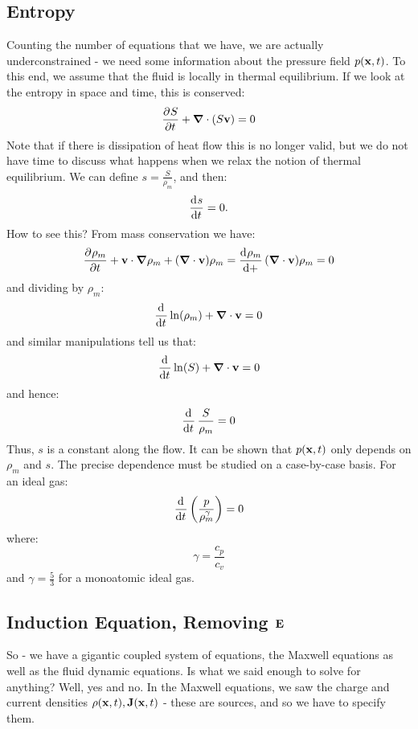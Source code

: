 \subsection{Entropy}
Counting the number of equations that we have, we are actually underconstrained - we need some information about the pressure field $p(\mathbf{x}, t)$. To this end, we assume that the fluid is locally in thermal equilibrium. If we look at the entropy in space and time, this is conserved:
\begin{equation}
    \dpd{S}{t} + \nabla\cdot (S\v{v}) = 0
\end{equation}
Note that if there is dissipation of heat flow this is no longer valid, but we do not have time to discuss what happens when we relax the notion of thermal equilibrium. We can define $s = \frac{S}{\rho_m}$, and then:
\begin{equation}
    \dod{s}{t} = 0.
\end{equation}
How to see this? From mass conservation we have:
\begin{equation}
    \dpd{\rho_m}{t} + \v{v} \cdot \nabla \rho_m + (\nabla \cdot \v{v})\rho_m = \dod{\rho_m} + (\nabla \cdot \v{v})\rho_m = 0
\end{equation}
and dividing by $\rho_m$:
\begin{equation}
    \dod{}{t}\ln(\rho_m) + \nabla \cdot \v{v} = 0
\end{equation}
and similar manipulations tell us that:
\begin{equation}
    \dod{}{t}\ln(S) + \nabla \cdot \v{v} = 0
\end{equation}
and hence:
\begin{equation}
    \dod{}{t}\frac{S}{\rho_m} = 0
\end{equation}
Thus, $s$ is a constant along the flow. It can be shown that $p(\mathbf{x}, t)$ only depends on $\rho_m$ and $s$. The precise dependence must be studied on a case-by-case basis. For an ideal gas:
\begin{equation}
    \dod{}{t}\left(\frac{p}{\rho^\gamma_m}\right) = 0
\end{equation}
where:
\begin{equation}
    \gamma = \frac{c_p}{c_v}
\end{equation}
and $\gamma = \frac{5}{3}$ for a monoatomic ideal gas.

\subsection{Induction Equation, Removing $\mathbf{E}$}
So - we have a gigantic coupled system of equations, the Maxwell equations as well as the fluid dynamic equations. Is what we said enough to solve for anything? Well, yes and no. In the Maxwell equations, we saw the charge and current densities $\rho(\mathbf{x}, t), \mathbf{J}(\mathbf{x}, t)$ - these are sources, and so we have to specify them.

